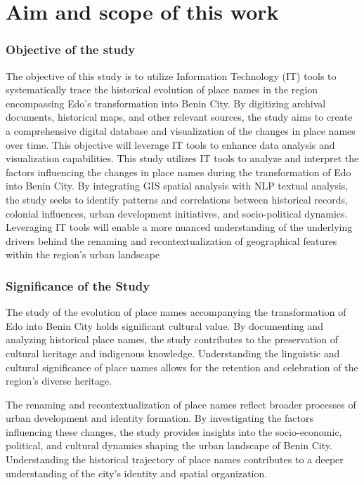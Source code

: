 \section{Aim and scope of this work}
\subsubsection{Objective of the study}
The objective of this study is to utilize Information Technology (IT) tools to systematically trace the historical evolution of place names in the region encompassing Edo's transformation into Benin City. By digitizing archival documents, historical maps, and other relevant sources, the study aims to create a comprehensive digital database and visualization of the changes in place names over time. This objective will leverage IT tools to enhance data analysis and visualization capabilities.
This study utilizes IT tools to analyze and interpret the factors influencing the changes in place names during the transformation of Edo into Benin City. By integrating GIS spatial analysis with NLP textual analysis, the study seeks to identify patterns and correlations between historical records, colonial influences, urban development initiatives, and socio-political dynamics. Leveraging IT tools will enable a more nuanced understanding of the underlying drivers behind the renaming and recontextualization of geographical features within the region's urban landscape
\subsubsection{Significance of the Study}
The study of the evolution of place names accompanying the transformation of Edo into Benin City holds significant cultural value. By documenting and analyzing historical place names, the study contributes to the preservation of cultural heritage and indigenous knowledge. Understanding the linguistic and cultural significance of place names allows for the retention and celebration of the region's diverse heritage. 

The renaming and recontextualization of place names reflect broader processes of urban development and identity formation. By investigating the factors influencing these changes, the study provides insights into the socio-economic, political, and cultural dynamics shaping the urban landscape of Benin City. Understanding the historical trajectory of place names contributes to a deeper understanding of the city's identity and spatial organization.


